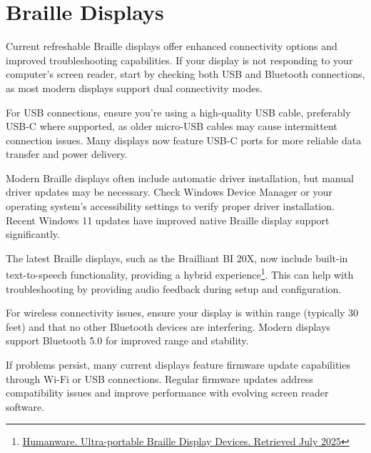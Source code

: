 \section{Braille Displays}\label{display2}
Current refreshable Braille displays offer enhanced connectivity options and improved troubleshooting capabilities. If your display is not responding to your computer's screen reader, start by checking both USB and Bluetooth connections, as most modern displays support dual connectivity modes.

For USB connections, ensure you're using a high-quality USB cable, preferably USB-C where supported, as older micro-USB cables may cause intermittent connection issues. Many displays now feature USB-C ports for more reliable data transfer and power delivery.

Modern Braille displays often include automatic driver installation, but manual driver updates may be necessary. Check Windows Device Manager or your operating system's accessibility settings to verify proper driver installation. Recent Windows 11 updates have improved native Braille display support significantly.

The latest Braille displays, such as the Brailliant BI 20X, now include built-in text-to-speech functionality, providing a hybrid experience\footnote{\raggedright \href{https://store.humanware.com/hus/braille-devices/ultra-portable-braille-display}{Humanware. Ultra-portable Braille Display Devices. Retrieved July 2025}}. This can help with troubleshooting by providing audio feedback during setup and configuration.

For wireless connectivity issues, ensure your display is within range (typically 30 feet) and that no other Bluetooth devices are interfering. Modern displays support Bluetooth 5.0 for improved range and stability.

If problems persist, many current displays feature firmware update capabilities through Wi-Fi or USB connections. Regular firmware updates address compatibility issues and improve performance with evolving screen reader software.

